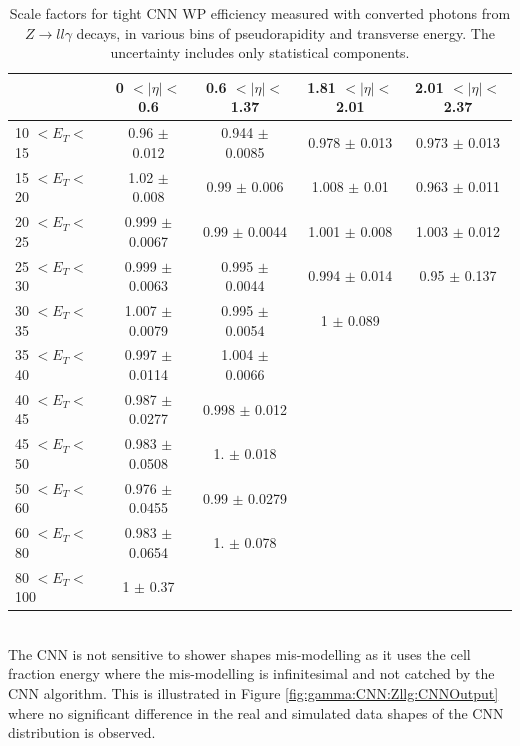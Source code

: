 \begin{table}[htbp]
    \centering
   \begin{tabular}{lcccc}
   \hline\hline
     & 0 $ < |\eta| < $ 0.6 & 0.6 $ < |\eta| < $ 1.37 & 1.81 $ < |\eta| < $ 2.01  & 2.01 $ < |\eta| < $ 2.37 \\
    \hline
10 $ < E_T < $ 15   & 0.96 $\pm$ 0.012   & 0.944 $\pm$ 0.0085 & 0.978 $\pm$ 0.013  & 0.973 $\pm$ 0.013\\
15 $ < E_T < $ 20   & 1.02 $\pm$ 0.008   & 0.99  $\pm$ 0.006  & 1.008 $\pm$ 0.01   & 0.963 $\pm$ 0.011\\
20 $ < E_T < $ 25   & 0.999 $\pm$ 0.0067 & 0.99  $\pm$ 0.0044 & 1.001 $\pm$ 0.008  & 1.003 $\pm$ 0.012\\
25 $ < E_T < $ 30   & 0.999 $\pm$ 0.0063 & 0.995 $\pm$ 0.0044 & 0.994 $\pm$ 0.014  & 0.95  $\pm$ 0.137\\
30 $ < E_T < $ 35   & 1.007 $\pm$ 0.0079 & 0.995 $\pm$ 0.0054 & 1     $\pm$ 0.089  & \\
35 $ < E_T < $ 40   & 0.997 $\pm$ 0.0114 & 1.004 $\pm$ 0.0066 &                    & \\
40 $ < E_T < $ 45   & 0.987 $\pm$ 0.0277 & 0.998 $\pm$ 0.012  &                    & \\
45 $ < E_T < $ 50   & 0.983 $\pm$ 0.0508 & 1.    $\pm$ 0.018  &                    & \\
50 $ < E_T < $ 60   & 0.976 $\pm$ 0.0455 & 0.99  $\pm$ 0.0279 &                    & \\
60 $ < E_T < $ 80   & 0.983 $\pm$ 0.0654 & 1.    $\pm$ 0.078  &                    & \\
80 $ < E_T < $ 100  & 1     $\pm$ 0.37   &                    &                    & \\
\hline\hline
\end{tabular}
\begin{tcolorbox}[colback=black!5!white,colframe=white!75!black]
\caption{Scale factors for tight CNN WP efficiency measured with converted photons from $Z\rightarrow ll\gamma$ decays, in various bins of pseudorapidity and transverse energy. The uncertainty includes only statistical components.}
\label{tab:gamma:CNN:Zllg:SF:C}
\end{tcolorbox}
\end{table}
\\
The CNN is not sensitive to shower shapes mis-modelling as it uses the cell fraction energy where the mis-modelling is infinitesimal and not catched by the CNN algorithm. This is illustrated in Figure \ref{fig:gamma:CNN:Zllg:CNNOutput} where no significant difference in the real and simulated data shapes of the CNN distribution is observed.

